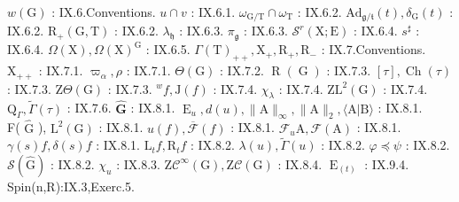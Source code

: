 \(w(\mathrm{G})\) : IX.6.Conventions. \(u\cap v\) : IX.6.1. \(\omega_{\mathrm{G / T}}\cap \omega_{\mathrm{T}}\) : IX.6.2. \(\mathrm{Ad}_{\mathfrak{g} / \mathfrak{t}}(t),\delta_{\mathrm{G}}(t)\) : IX.6.2. \(\mathrm{R}_+(\mathrm{G},\mathrm{T})\) : IX.6.2. \(\lambda_{\mathfrak{h}}\) : IX.6.3. \(\pi_{\mathfrak{g}}\) : IX.6.3. \(\mathcal{S}^r (\mathrm{X};\mathrm{E})\) : IX.6.4. \(s^\sharp\) : IX.6.4. \(\Omega (\mathrm{X}),\Omega (\mathrm{X})^{\mathrm{G}}\) : IX.6.5. \(\Gamma (\mathrm{T})_{++},\mathrm{X}_{+},\mathrm{R}_{+},\mathrm{R}_{-}\) : IX.7.Conventions. \(\mathrm{X}_{++}\) : IX.7.1. \(\varpi_{\alpha},\rho\) : IX.7.1. \(\Theta (\mathrm{G})\) : IX.7.2. \(\operatorname {R}(\operatorname {G})\) : IX.7.3. \([\tau ],\operatorname {Ch}(\tau)\) : IX.7.3. \(\mathrm{Z}\Theta (\mathrm{G})\) : IX.7.3. \(^w f,\mathrm{J}(f)\) : IX.7.4. \(\chi_{\lambda}\) : IX.7.4. \(\mathrm{ZL}^2 (\mathrm{G})\) : IX.7.4. \(\mathrm{Q}_{\Gamma},\tilde{\Gamma} (\tau)\) : IX.7.6. \(\hat{\mathbf{G}}\) : IX.8.1. \(\operatorname {E}_u,d(u),\| \mathrm{A}\|_\infty ,\| \mathrm{A}\| _2,\langle \mathrm{A}|\mathrm{B}\rangle\) : IX.8.1.\\
F( \(\hat{\mathrm{G}}\) ), \(\mathrm{L}^2 (\mathrm{G})\) : IX.8.1. \(u(f),\overline{\mathcal{F}} (f)\) : IX.8.1. \(\mathcal{F}_u\mathrm{A},\mathcal{F}(\mathrm{A})\) : IX.8.1. \(\gamma (s)f,\delta (s)f\) : IX.8.1. \(\mathrm{L}_t f,\mathrm{R}_t f\) : IX.8.2. \(\lambda (u),\tilde{\Gamma} (u)\) : IX.8.2. \(\varphi \preccurlyeq \psi\) : IX.8.2. \(\mathcal{S}(\hat{\mathrm{G}})\) : IX.8.2. \(\chi_u\) : IX.8.3. \(\mathrm{Z}\mathcal{C}^{\infty}(\mathrm{G}),\mathrm{Z}\mathcal{C}(\mathrm{G})\) : IX.8.4. \(\operatorname {E}_{(t)}\) : IX.9.4.\\
Spin(n,R):IX.3,Exerc.5.

